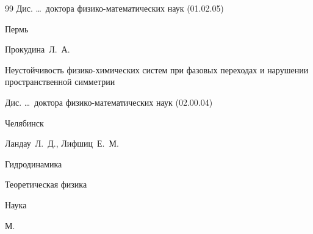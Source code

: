 \begin{thebibliography}{99}
\thesisinfo Дис. \dots\ доктора физико-математических наук (01.02.05)

\publaddr Пермь
















\by Прокудина~Л.~А.

\thesis Неустойчивость физико-химических систем при фазовых переходах и нарушении пространственной симметрии

\thesisinfo Дис. \dots\ доктора физико-математичес\-ких наук (02.00.04)

\publaddr Челябинск













\by Ландау~Л.~Д., Лифшиц~Е.~М.

\book Гидродинамика

\serial Теоретическая физика



\publ Наука

\publaddr М.









\end{thebibliography}
